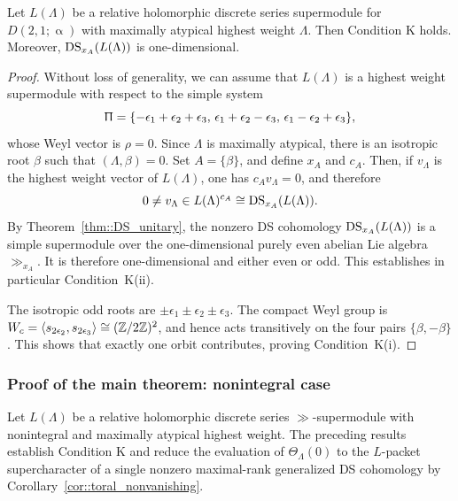 \begin{proposition}
\label{prop::D21alpha_condition_K}
Let $L(\Lambda)$ be a relative holomorphic discrete series supermodule for $D(2,1;\upalpha)$ with maximally atypical highest weight $\Lambda$. Then Condition K holds. Moreover, $\operatorname{DS}_{x_A}(L(\Lambda))$ is one-dimensional.
\end{proposition}


\begin{proof}
Without loss of generality, we can assume that $L(\Lambda)$ is
a highest weight supermodule with respect to the simple system
\begin{equation*}
\Uppi
=
\{-\epsilon_1+\epsilon_2+\epsilon_3,\,
\epsilon_1+\epsilon_2-\epsilon_3,\,
\epsilon_1-\epsilon_2+\epsilon_3\},
\end{equation*}
whose Weyl vector is $\rho=0$.
Since $\Lambda$ is maximally atypical, there is an isotropic
root $\beta$ such that $(\Lambda,\beta)=0$.
Set $A=\{\beta\}$, and define $x_{A}$ and $c_{A}$. Then, if $v_{\Lambda}$ is the highest weight vector of $L(\Lambda)$, one has $c_Av_\Lambda=0$, and therefore
\begin{equation*}
0\neq v_\Lambda\in L(\Lambda)^{c_A}
\cong\operatorname{DS}_{x_A}(L(\Lambda)).
\end{equation*}
By Theorem~\ref{thm::DS_unitary}, the nonzero DS cohomology
$\operatorname{DS}_{x_A}(L(\Lambda))$ is a simple supermodule over the
one-dimensional purely even abelian Lie algebra $\gg_{x_A}$.
It is therefore one-dimensional and either even or odd. This establishes in particular Condition~K(ii). 


The isotropic odd roots are $\pm\epsilon_1\pm\epsilon_2\pm\epsilon_3$. The compact Weyl group is
$
W_c=\langle s_{2\epsilon_2},s_{2\epsilon_3}\rangle\cong({\mathbb Z}/2{\mathbb Z})^2
$, and hence acts transitively on the four pairs $\{\beta,-\beta\}$. This shows that exactly one orbit contributes, proving Condition~K(i).
\end{proof}


\subsubsection{Proof of the main theorem: nonintegral case}
\label{subsec::proof_main_theorem}
Let $L(\Lambda)$ be a relative holomorphic discrete series $\gg$-supermodule with nonintegral and maximally atypical highest weight. The preceding results establish Condition K and reduce the evaluation of $\Theta_\Lambda(0)$ to the $L$-packet supercharacter of a single nonzero maximal-rank generalized DS cohomology by Corollary~\ref{cor::toral_nonvanishing}.

